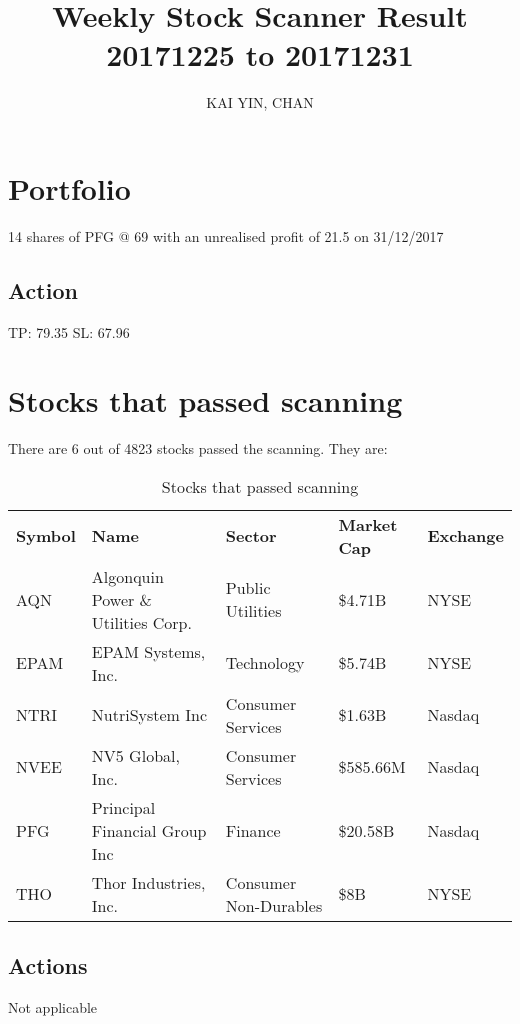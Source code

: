 \documentclass{article}
\begin{document}
\title{Weekly Stock Scanner Result \\ 20171225 to 20171231}
\author{KAI YIN, CHAN}
\maketitle

\section{Portfolio}
14 shares of PFG @ 69 with an unrealised profit of 21.5 on 31/12/2017

\subsection{Action}
TP: 79.35 SL: 67.96

\section{Stocks that passed scanning}

There are 6 out of 4823 stocks passed the scanning.  They are:
\begin{table}[htbp]
  \caption{Stocks that passed scanning}
    \begin{tabular}{lllll}
    	\textbf{Symbol} & \textbf{Name} & \textbf{Sector} & \textbf{Market Cap} & \textbf{Exchange} \\
    	AQN   & Algonquin Power \& Utilities Corp. & Public Utilities & \$4.71B & NYSE \\
    	EPAM  & EPAM Systems, Inc. & Technology & \$5.74B & NYSE \\
    	NTRI  & NutriSystem Inc & Consumer Services & \$1.63B & Nasdaq \\
    	NVEE  & NV5 Global, Inc. & Consumer Services & \$585.66M & Nasdaq \\
    	PFG   & Principal Financial Group Inc & Finance & \$20.58B & Nasdaq \\
    	THO   & Thor Industries, Inc. & Consumer Non-Durables & \$8B  & NYSE \\
    \end{tabular}%
    \label{tab:addlabel}%
\end{table}%

\subsection{Actions}
Not applicable
\end{document}
